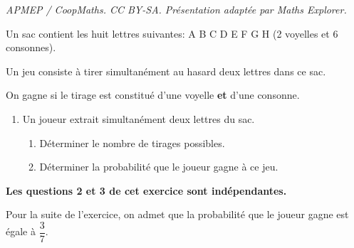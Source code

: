\documentclass[10pt]{article}
\begin{document}
\noindent\textit{APMEP / CoopMaths. CC BY-SA. Présentation adaptée par Maths Explorer.}\par\medskip
\medskip

Un sac contient les huit lettres suivantes: A B C D E F G H (2 voyelles et 6 consonnes).

Un jeu consiste à tirer simultanément au hasard deux lettres dans ce sac. 

On gagne si le tirage est constitué d'une voyelle \textbf{et} d'une consonne.

\medskip

\begin{enumerate}
\item Un joueur extrait simultanément deux lettres du sac.
	\begin{enumerate}
		\item Déterminer le nombre de tirages possibles.
		\item Déterminer la probabilité que le joueur gagne à ce jeu.
	\end{enumerate}
\end{enumerate}

\medskip
	
\textbf{Les questions 2 et 3 de cet exercice sont indépendantes.}

\medskip

Pour la suite de l'exercice, on admet que la probabilité que le joueur gagne est égale à $\dfrac{3}{7}$.
\end{document}
